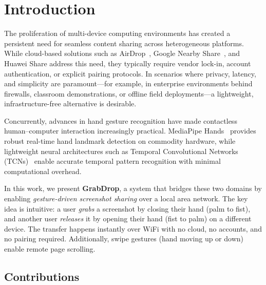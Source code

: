 \section{Introduction}
\label{sec:introduction}

The proliferation of multi-device computing environments has created a
persistent need for seamless content sharing across heterogeneous platforms.
While cloud-based solutions such as AirDrop~\cite{apple2023airdrop},
Google Nearby Share~\cite{google2023nearby}, and Huawei Share
address this need, they typically require vendor lock-in, account
authentication, or explicit pairing protocols. In scenarios
where privacy, latency, and simplicity are paramount---for example, in
enterprise environments behind firewalls, classroom demonstrations, or
offline field deployments---a lightweight, infrastructure-free alternative
is desirable.

Concurrently, advances in hand gesture recognition have made contactless
human--computer interaction increasingly practical. MediaPipe
Hands~\cite{zhang2020mediapipe} provides robust real-time hand landmark
detection on commodity hardware, while lightweight neural architectures
such as Temporal Convolutional Networks (TCNs)~\cite{bai2018empirical,
lea2017temporal} enable accurate temporal pattern recognition with
minimal computational overhead.

In this work, we present \textbf{GrabDrop}, a system that bridges these
two domains by enabling \emph{gesture-driven screenshot sharing} over a
local area network. The key idea is intuitive: a user \emph{grabs} a
screenshot by closing their hand (palm to fist), and another user
\emph{releases} it by opening their hand (fist to palm) on a different
device. The transfer happens instantly over WiFi with no cloud, no
accounts, and no pairing required. Additionally, swipe gestures (hand
moving up or down) enable remote page scrolling.

\subsection{Contributions}

